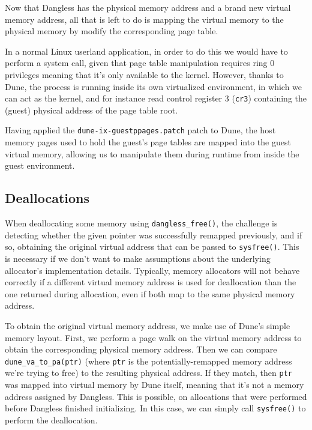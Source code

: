 
Now that Dangless has the physical memory address and a brand new virtual memory address, all that is left to do is mapping the virtual memory to the physical memory by modify the corresponding page table.

In a normal Linux userland application, in order to do this we would have to perform a system call, given that page table manipulation requires ring 0 privileges meaning that it's only available to the kernel. However, thanks to Dune, the process is running inside its own virtualized environment, in which we can act as the kernel, and for instance read control register 3 (\lstinline!cr3!) containing the (guest) physical address of the page table root.

Having applied the \texttt{dune-ix-guestppages.patch} patch to Dune, the host memory pages used to hold the guest's page tables are mapped into the guest virtual memory, allowing us to manipulate them during runtime from inside the guest environment.

\subsection{Deallocations}
\label{ssec:deallocations}

When deallocating some memory using \lstinline!dangless_free()!, the challenge is detecting whether the given pointer was successfully remapped previously, and if so, obtaining the original virtual address that can be passed to \lstinline!sysfree()!.
This is necessary if we don't want to make assumptions about the underlying allocator's implementation details. Typically, memory allocators will not behave correctly if a different virtual memory address is used for deallocation than the one returned during allocation, even if both map to the same physical memory address.

To obtain the original virtual memory address, we make use of Dune's simple memory layout. First, we perform a page walk on the virtual memory address to obtain the corresponding physical memory address. Then we can compare \lstinline!dune_va_to_pa(ptr)! (where \lstinline!ptr! is the potentially-remapped memory address we're trying to free) to the resulting physical address.
If they match, then \lstinline!ptr! was mapped into virtual memory by Dune itself, meaning that it's not a memory address assigned by Dangless. This is possible, on allocations that were performed before Dangless finished initializing. In this case, we can simply call \lstinline!sysfree()! to perform the deallocation.

